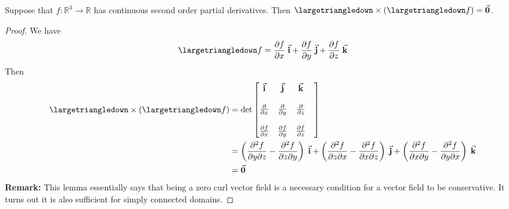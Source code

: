 

\begin{lemma}
    Suppose that \( f: \mathbb{R}^{3} \to \mathbb{R} \) has continuous second order partial derivatives. Then \( \largetriangledown \times \left( \largetriangledown f \right) = \va{0} \).
\end{lemma}
\begin{proof}
        We have 
    \[ \largetriangledown f = \pdv{f}{x}\;  \va{i} + \pdv{f }{y} \; \va{j} + \pdv{f }{z}\;  \va{k} \]
    Then 
    \begin{align*}
        \largetriangledown \times \left( \largetriangledown f \right) &= \det \begin{bmatrix}
            \va{i} & \va{j} & \va{k}\\
            & & & \\
            \pdv{x} & \pdv{y} & \pdv{z}\\
            & & & \\
            \pdv{f}{x} & \pdv{f}{y} &\pdv{f}{z}\\
        \end{bmatrix}\\
        &= \left( \pdv{f}{y}{z} - \pdv{f}{z}{y} \right)\;  \va{i} +  \left( \pdv{f}{z}{x} - \pdv{f}{x}{z} \right)\;  \va{j} + \left( \pdv{f}{x}{y} - \pdv{f}{y}{x} \right)\;  \va{k}\\
        &= \va{0}
    \end{align*}
    \textbf{Remark:} This lemma essentially says that being a zero curl vector field is a necessary condition for a vector field to be conservative. It turns out it is also sufficient for simply connected domains.
\end{proof}
